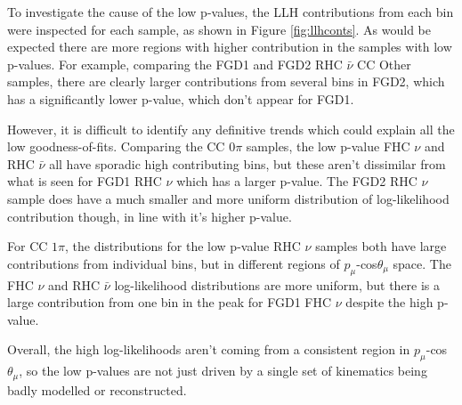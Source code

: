 To investigate the cause of the low p-values, the LLH contributions from each bin were inspected for each sample, as shown in Figure \ref{fig:llhconts}. As would be expected there are more regions with higher contribution in the samples with low p-values. For example, comparing the FGD1 and FGD2 RHC $\bar{\nu}$ CC Other samples, there are clearly larger contributions from several bins in FGD2, which has a significantly lower p-value, which don't appear for FGD1.

However, it is difficult to identify any definitive trends which could explain all the low goodness-of-fits. Comparing the CC 0$\pi$ samples, the low p-value FHC $\nu$ and RHC $\bar{\nu}$ all have sporadic high contributing bins, but these aren't dissimilar from what is seen for FGD1 RHC $\nu$ which has a larger p-value. The FGD2 RHC $\nu$ sample does have a much smaller and more uniform distribution of log-likelihood contribution though, in line with it's higher p-value.

For CC $1\pi$, the distributions for the low p-value RHC $\nu$ samples both have large contributions from individual bins, but in different regions of $p_{\mu}$-cos$\theta_{\mu}$ space. The FHC $\nu$ and RHC $\bar{\nu}$ log-likelihood distributions are more uniform, but there is a large contribution from one bin in the peak for FGD1 FHC $\nu$ despite the high p-value.

Overall, the high log-likelihoods aren't coming from a consistent region in $p_{\mu}$-cos$\theta_{\mu}$, so the low p-values are not just driven by a single set of kinematics being badly modelled or reconstructed. 

